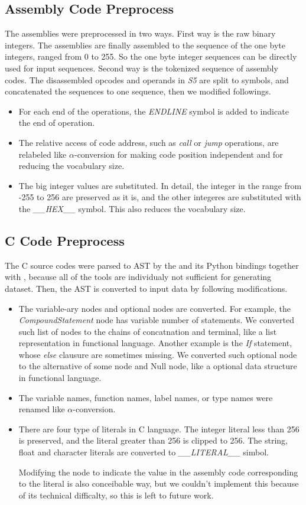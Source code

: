 \documentclass[senior,final,11pt]{iscs-thesis}
\begin{document}
\subsection{Assembly Code Preprocess}
The assemblies were preprocessed in two ways.
First way is the raw binary integers. The assemblies are finally assembled to the sequence of the one byte integers, ranged from 0 to 255.
So the one byte integer sequences can be directly used for input sequences.
Second way is the tokenized sequence of assembly codes. 
The disassembled opcodes and operands in {\sl S5} are split to symbols, and concatenated the sequences to one sequence, then we modified followings.
\begin{itemize}
\item For each end of the operations, the {\sl ENDLINE} symbol is added to indicate the end of operation.
\item 
The relative access of code address, such as {\sl call} or {\sl jump} operations, 
are relabeled like $\alpha$-conversion for making code position independent and for reducing the vocabulary size.
\item The big integer values are substituted. 
In detail, the integer in the range from -255 to 256 are preserved as it is, and the other integeres are substituted with the {\sl \_\_HEX\_\_} symbol.
This also reduces the vocabulary size.
\end{itemize}


\subsection{C Code Preprocess}
The C source codes were parsed to AST by the \cite{clang} and its Python bindings together with \cite{pycparser}, 
because all of the tools are individualy not sufficient for generating dataset.
Then, the AST is converted to input data by following modifications.

\begin{itemize}
\item The variable-ary nodes and optional nodes are converted. 
For example, the {\sl CompoundStatement} node has variable number of statements. 
We converted such list of nodes to the chains of concatnation and terminal, like a list representation in functional language.
Another example is the  {\sl If} statement, whose {\sl else} clausure are sometimes missing. 
We converted such optional node to the alternative of some node and Null node, like a optional data structure in functional language.
\item The variable names, function names, label names, or type names were renamed like $\alpha$-conversion.
\item There are four type of literals in C language. 
The integer literal less than 256 is preserved, and the literal greater than 256 is clipped to 256.
The string, float and character literals are converted to {\sl \_\_LITERAL\_\_} simbol.

Modifying the node to indicate the value in the assembly code corresponding to the literal is also conceibable way,
but we couldn't implement this because of its technical difficalty, so this is left to future work.
\end{itemize}
\end{document}
